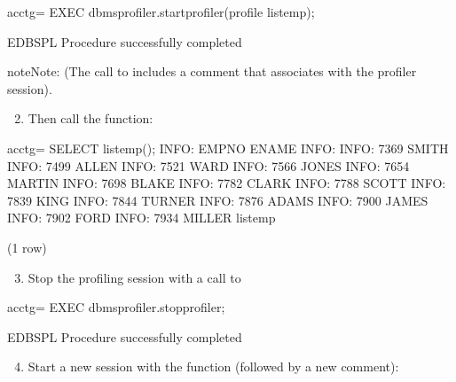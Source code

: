 \documentclass[letterpaper,10pt,english,openany,oneside]{sphinxmanual}
\begin{document}
%
\begin{sphinxVerbatim}[commandchars=\\\{\}]
acctg=\PYGZsh{} EXEC dbms\PYGZus{}profiler.start\PYGZus{}profiler(\PYGZsq{}profile list\PYGZus{}emp\PYGZsq{});

EDB\PYGZhy{}SPL Procedure successfully completed
\end{sphinxVerbatim}

\begin{sphinxadmonition}{note}{Note:}
(The call to  includes a comment that
 associates with the profiler session).
\end{sphinxadmonition}
\begin{enumerate}
\setcounter{enumi}{1}
\item {} 
Then call the  function:

\end{enumerate}

%
\begin{sphinxVerbatim}[commandchars=\\\{\}]
acctg=\PYGZsh{} SELECT list\PYGZus{}emp();
INFO:  EMPNO    ENAME
INFO:  \PYGZhy{}\PYGZhy{}\PYGZhy{}\PYGZhy{}\PYGZhy{}    \PYGZhy{}\PYGZhy{}\PYGZhy{}\PYGZhy{}\PYGZhy{}\PYGZhy{}\PYGZhy{}
INFO:  7369     SMITH
INFO:  7499     ALLEN
INFO:  7521     WARD
INFO:  7566     JONES
INFO:  7654     MARTIN
INFO:  7698     BLAKE
INFO:  7782     CLARK
INFO:  7788     SCOTT
INFO:  7839     KING
INFO:  7844     TURNER
INFO:  7876     ADAMS
INFO:  7900     JAMES
INFO:  7902     FORD
INFO:  7934     MILLER
 list\PYGZus{}emp
\PYGZhy{}\PYGZhy{}\PYGZhy{}\PYGZhy{}\PYGZhy{}\PYGZhy{}\PYGZhy{}\PYGZhy{}\PYGZhy{}\PYGZhy{}

(1 row)
\end{sphinxVerbatim}
\begin{enumerate}
\setcounter{enumi}{2}
\item {} 
Stop the profiling session with a call to

\end{enumerate}

%
\begin{sphinxVerbatim}[commandchars=\\\{\}]
acctg=\PYGZsh{} EXEC dbms\PYGZus{}profiler.stop\PYGZus{}profiler;

EDB\PYGZhy{}SPL Procedure successfully completed
\end{sphinxVerbatim}
\begin{enumerate}
\setcounter{enumi}{3}
\item {} 
Start a new session with the  function
(followed by a new comment):

\end{enumerate}
\end{document}

